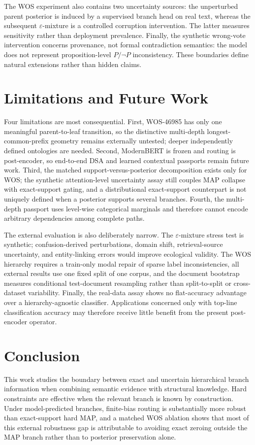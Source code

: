 \documentclass[preprint,11pt]{elsarticle}
\begin{document}
The WOS experiment also contains two uncertainty sources: the unperturbed parent posterior is induced by a supervised branch head on real text, whereas the subsequent $\varepsilon$-mixture is a controlled corruption intervention. The latter measures sensitivity rather than deployment prevalence. Finally, the synthetic wrong-vote intervention concerns provenance, not formal contradiction semantics: the model does not represent proposition-level $P/\neg P$ inconsistency. These boundaries define natural extensions rather than hidden claims.

\section{Limitations and Future Work}
Four limitations are most consequential. First, WOS-46985 has only one meaningful parent-to-leaf transition, so the distinctive multi-depth longest-common-prefix geometry remains externally untested; deeper independently defined ontologies are needed. Second, ModernBERT is frozen and routing is post-encoder, so end-to-end DSA and learned contextual passports remain future work. Third, the matched support-versus-posterior decomposition exists only for WOS; the synthetic attention-level uncertainty assay still couples MAP collapse with exact-support gating, and a distributional exact-support counterpart is not uniquely defined when a posterior supports several branches. Fourth, the multi-depth passport uses level-wise categorical marginals and therefore cannot encode arbitrary dependencies among complete paths.

The external evaluation is also deliberately narrow. The $\varepsilon$-mixture stress test is synthetic; confusion-derived perturbations, domain shift, retrieval-source uncertainty, and entity-linking errors would improve ecological validity. The WOS hierarchy requires a train-only modal repair of sparse label inconsistencies, all external results use one fixed split of one corpus, and the document bootstrap measures conditional test-document resampling rather than split-to-split or cross-dataset variability. Finally, the real-data assay shows no flat-accuracy advantage over a hierarchy-agnostic classifier. Applications concerned only with top-line classification accuracy may therefore receive little benefit from the present post-encoder operator.

\section{Conclusion}
This work studies the boundary between exact and uncertain hierarchical branch information when combining semantic evidence with structural knowledge. Hard constraints are effective when the relevant branch is known by construction. Under model-predicted branches, finite-bias routing is substantially more robust than exact-support hard MAP, and a matched WOS ablation shows that most of this external robustness gap is attributable to avoiding exact zeroing outside the MAP branch rather than to posterior preservation alone.
\end{document}
